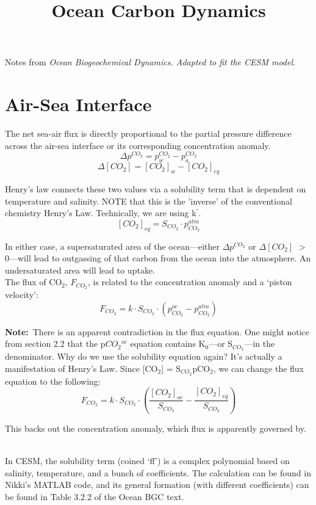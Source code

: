 \documentclass[12pt]{article}
\title{Ocean Carbon Dynamics}
\newcommand{\pco}{p$CO_{2}$}
\begin{document}
\maketitle
Notes from \it Ocean Biogeochemical Dynamics\rm. Adapted to fit the CESM model.

\section{Air-Sea Interface}
The net sea-air flux is directly proportional to the partial pressure difference across the air-sea interface or its corresponding concentration anomaly.
$$
	\Delta p^{CO_{2}} = p^{CO_{2}}_{w} - p^{CO_{2}}_{a}
$$
$$
	\Delta[CO_{2}] = [CO_{2}]_{w} - [CO_{2}]_{eq}
$$

Henry's law connects these two values via a solubility term that is dependent on temperature and salinity. NOTE that this is the 'inverse' of the conventional chemistry Henry's Law. Technically, we are using k$^{\prime}$.
$$
[CO_{2}]_{eq} = S_{CO_{2}}\cdot p_{CO_{2}}^{atm}
$$

In either case, a supersaturated area of the ocean---either $\Delta p^{CO_{2}}$ or $\Delta[CO_{2}]$ $>$ 0---will lead to outgassing of that carbon from the ocean into the atmosphere. An undersaturated area will lead to uptake. \\

The flux of CO$_{2}$, $F_{CO_{2}}$, is related to the concentration anomaly and a `piston velocity':
$$
	F_{CO_{2}} = k\cdot S_{CO_{2}}\cdot(p_{CO_{2}}^{oc} - p_{CO_{2}}^{atm})
$$

{\color{red} {\bf Note:}~There is an apparent contradiction in the flux equation. One might notice from section 2.2 that the \pco$^{oc}$ equation contains K$_{0}$---or S$_{CO_{2}}$---in the denominator. Why do we use the solubility equation again? It's actually a manifestation of Henry's Law. Since [CO$_{2}$] = S$_{CO_{2}}$pCO$_{2}$, we can change the flux equation to the following:
$$
	F_{CO_{2}} = k\cdot S_{CO_{2}}\cdot (\frac{[CO_{2}]_{oc}}{S_{CO_{2}}} - \frac{[CO_{2}]_{eq}}{S_{CO_{2}}})
$$	

This backs out the concentration anomaly, which flux is apparently governed by.} \\

In CESM, the solubility term (coined `ff') is a complex polynomial based on salinity, temperature, and a bunch of coefficients. The calculation can be found in Nikki's MATLAB code, and its general formation (with different coefficients) can be found in Table 3.2.2 of the Ocean BGC text. \\
\end{document}
